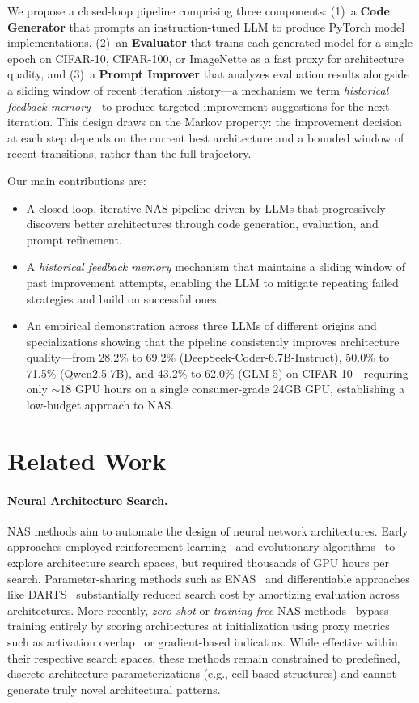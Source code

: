 \documentclass[10pt,twocolumn,letterpaper]{article}
\begin{document}
	We propose a closed-loop pipeline comprising three components: (1)~a \textbf{Code Generator} that prompts an instruction-tuned LLM to produce PyTorch model implementations, (2)~an \textbf{Evaluator} that trains each generated model for a single epoch on CIFAR-10, CIFAR-100, or ImageNette as a fast proxy for architecture quality, and (3)~a \textbf{Prompt Improver} that analyzes evaluation results alongside a sliding window of recent iteration history---a mechanism we term \emph{historical feedback memory}---to produce targeted improvement suggestions for the next iteration. This design draws on the Markov property: the improvement decision at each step depends on the current best architecture and a bounded window of recent transitions, rather than the full trajectory.
	
	Our main contributions are:
	\begin{itemize}
		\item A closed-loop, iterative NAS pipeline driven by LLMs that progressively discovers better architectures through code generation, evaluation, and prompt refinement.
		\item A \emph{historical feedback memory} mechanism that maintains a sliding window of past improvement attempts, enabling the LLM to mitigate repeating failed strategies and build on successful ones.
		\item An empirical demonstration across three LLMs of different origins and specializations showing that the pipeline consistently improves architecture quality---from 28.2\% to 69.2\% (DeepSeek-Coder-6.7B-Instruct), 50.0\% to 71.5\% (Qwen2.5-7B), and 43.2\% to 62.0\% (GLM-5) on CIFAR-10---requiring only $\sim$18 GPU hours on a single consumer-grade 24GB GPU, establishing a low-budget approach to NAS.
	\end{itemize}
	
	\section{Related Work}
	\label{sec:Related}
	
	\paragraph{Neural Architecture Search.}
	NAS methods aim to automate the design of neural network architectures. Early approaches employed reinforcement learning~\cite{Zoph2017} and evolutionary algorithms~\cite{Real2019} to explore architecture search spaces, but required thousands of GPU hours per search. Parameter-sharing methods such as ENAS~\cite{Pham2018} and differentiable approaches like DARTS~\cite{Liu2019DARTS} substantially reduced search cost by amortizing evaluation across architectures. More recently, \emph{zero-shot} or \emph{training-free} NAS methods~\cite{Mellor2021,Li2024ZeroShot} bypass training entirely by scoring architectures at initialization using proxy metrics such as activation overlap~\cite{Mellor2021} or gradient-based indicators. While effective within their respective search spaces, these methods remain constrained to predefined, discrete architecture parameterizations (e.g., cell-based structures) and cannot generate truly novel architectural patterns.
	
\end{document}
